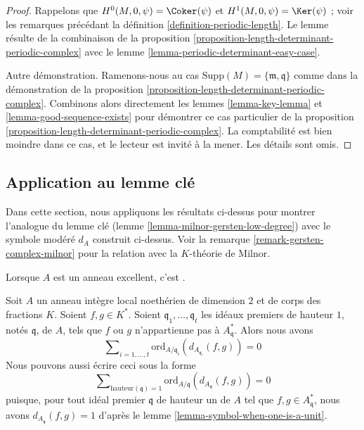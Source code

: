 \begin{proof}
Rappelons que $H^0(M, 0, \psi) = \Coker(\psi)$ et
$H^1(M, 0, \psi) = \Ker(\psi)$ ; voir les remarques précédant
la définition \ref{definition-periodic-length}.
Le lemme résulte de la combinaison de la
proposition \ref{proposition-length-determinant-periodic-complex} avec le
lemme \ref{lemma-periodic-determinant-easy-case}.

\medskip\noindent
Autre démonstration. Ramenons-nous au cas
$\text{Supp}(M) = \{\mathfrak m, \mathfrak q\}$
comme dans la démonstration de la
proposition \ref{proposition-length-determinant-periodic-complex}.
Combinons alors directement les
lemmes \ref{lemma-key-lemma} et
\ref{lemma-good-sequence-exists}
pour démontrer ce cas particulier de la
proposition \ref{proposition-length-determinant-periodic-complex}.
La comptabilité est bien moindre dans ce cas, et le lecteur est
invité à la mener. Les détails sont omis.
\end{proof}




\subsection{Application au lemme clé}
\label{subsection-application-tame-symbol}

\noindent
Dans cette section, nous appliquons les résultats ci-dessus pour montrer
l'analogue du lemme clé (lemme \ref{lemma-milnor-gersten-low-degree})
avec le symbole modéré $d_A$ construit ci-dessus. Voir la
remarque \ref{remark-gersten-complex-milnor}
pour la relation avec la $K$-théorie de Milnor.

\begin{lemma}
\label{lemma-secondary-ramification}
\begin{reference}
Lorsque $A$ est un anneau excellent, c'est \cite[Proposition 1]{Kato-Milnor-K}.
\end{reference}
Soit $A$ un anneau intègre local noethérien de dimension $2$ et de corps des fractions $K$.
Soient $f, g \in K^*$.
Soient $\mathfrak q_1, \ldots, \mathfrak q_t$ les idéaux premiers de hauteur
$1$, notés $\mathfrak q$, de $A$, tels que $f$ ou $g$ n'appartienne pas à
$A^*_{\mathfrak q}$.
Alors nous avons
$$
\sum\nolimits_{i = 1, \ldots, t}
\text{ord}_{A/\mathfrak q_i}(d_{A_{\mathfrak q_i}}(f, g))
=
0
$$
Nous pouvons aussi écrire ceci sous la forme
$$
\sum\nolimits_{\text{hauteur}(\mathfrak q) = 1}
\text{ord}_{A/\mathfrak q}(d_{A_{\mathfrak q}}(f, g))
=
0
$$
puisque, pour tout idéal premier $\mathfrak q$ de hauteur un
de $A$ tel que $f, g \in A^*_{\mathfrak q}$,
nous avons $d_{A_{\mathfrak q}}(f, g) = 1$ d'après le
lemme \ref{lemma-symbol-when-one-is-a-unit}.
\end{lemma}

